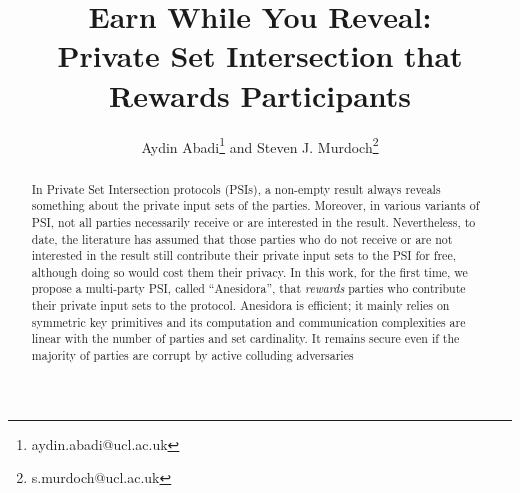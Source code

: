 \documentclass[orivec]{llncs}
\newcommand{\withRew}{{Anesidora}\xspace}
\begin{document}
  \setlength\abovedisplayskip{0pt}
  \setlength\belowdisplayskip{0pt}


\newenvironment{packed_item}{
\begin{itemize}
	\setlength{\topsep}{0pt}
	\setlength{\partopsep}{0pt}
  \setlength{\itemsep}{0pt}
  \setlength{\parskip}{0pt}
  \setlength{\parsep}{0pt}
}{\end{itemize}}

\newenvironment{packed_enum}{
\begin{enumerate}
	\setlength{\topsep}{0pt}
	\setlength{\partopsep}{0pt}
  \setlength{\itemsep}{0pt}
  \setlength{\parskip}{0pt}
  \setlength{\parsep}{0pt}
}{\end{enumerate}}
















\title{Earn While You Reveal: \\ Private Set Intersection that Rewards Participants}
%


\author{%
Aydin Abadi\thanks{aydin.abadi@ucl.ac.uk}\hspace{1mm} and \hspace{1mm} 
Steven J. Murdoch\thanks{s.murdoch@ucl.ac.uk}
}


\date{}
\maketitle{}


\begin{abstract}
In Private Set Intersection protocols (PSIs), a non-empty result always reveals something about the private input sets of the parties. Moreover, in various variants of PSI, not all parties necessarily receive or are interested in the result. Nevertheless, to date, the literature has assumed that those parties who do not receive or are not interested in the result still contribute their private input sets to the PSI for free, although doing so would cost them their privacy. In this work, for the first time, we propose a multi-party PSI, called ``\withRew'', that \emph{rewards} parties who contribute their private input sets to the protocol.  %
\withRew is efficient; it mainly relies on symmetric key primitives and its computation and communication complexities are linear with the number of parties and set cardinality. It remains secure even if the majority of parties are corrupt by active colluding adversaries





\end{abstract}
 
 
 


\appendix




%
%
%
\end{document}
